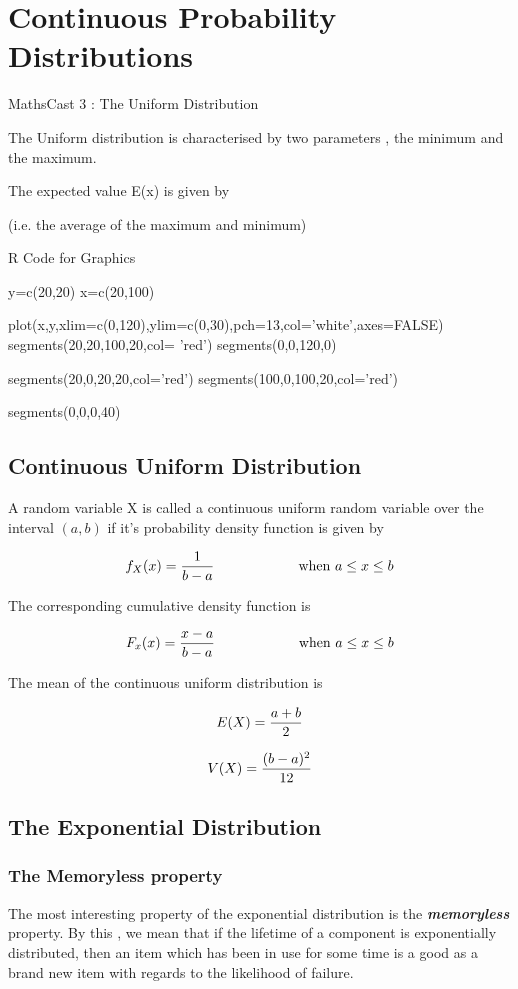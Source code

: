 \documentclass[12pt]{report}
\begin{document}
{{%
\chapter{Continuous Probability Distributions}
MathsCast 3 : The Uniform Distribution



The Uniform distribution is characterised by two parameters , the minimum and the maximum.

The expected value E(x) is given by



(i.e. the average of the maximum and minimum)





R Code for Graphics

y=c(20,20)
x=c(20,100)

plot(x,y,xlim=c(0,120),ylim=c(0,30),pch=13,col='white',axes=FALSE)
segments(20,20,100,20,col= 'red')
segments(0,0,120,0)

segments(20,0,20,20,col='red')
segments(100,0,100,20,col='red')

segments(0,0,0,40)
\section{Continuous Uniform Distribution}
A random variable X is called a continuous uniform random variable over the interval $(a,b)$ if it's probability density function is given by

\[ f_{X}(x)  =  { 1 \over b-a}   \hspace{2cm}  \mbox{ when } a \leq x \leq b\]

The corresponding cumulative density function is

\[ F_x(x) = { x-a \over b-a}   \hspace{2cm}  \mbox{ when } a \leq x \leq b\]



The mean of the continuous uniform distribution is

\[ E(X) = {a+b \over 2}\]

\[ V(X) = {(b-a)^2\over12}\]


\newpage
\section*{The Exponential Distribution}
\subsection*{The Memoryless property}
The most interesting property of the exponential distribution is the \textbf{\emph{memoryless}} property. By this , we mean that if  the lifetime of a component is exponentially distributed, then an item which has been in use for some time is a good as a brand new item with regards to the likelihood of failure.

}}
\end{document}
